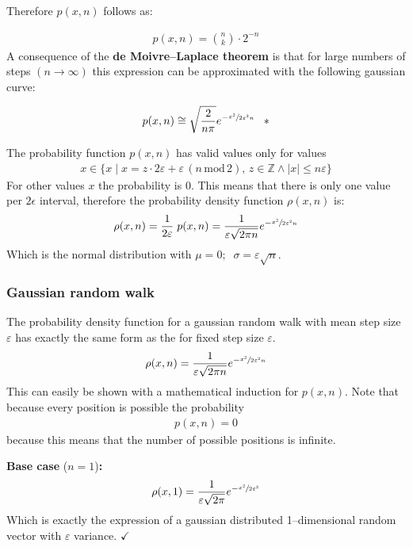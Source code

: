 \documentclass[a4paper, parskip=half]{scrartcl}
\newcommand{\effect}[1]{%
	\textbf{#1}%
}
\newcommand{\myEqLabel}[1]{\label{eq:#1}}
\newcommand{\myEqAnnex}[1]{\;\;\;\ast \myEqLabel{#1}}
\begin{document}
Therefore $p(x,n)$ follows as:

\begin{align}
p(x,n) = \binom{n}{k} \cdot 2^{-n}
\end{align}
A consequence of the \effect{de Moivre–Laplace theorem} is that for large numbers of steps $(n\rightarrow\infty)$ this expression can be approximated with the following gaussian curve:

\begin{align}
p(x,n) \cong \sqrt{\frac{2}{n \pi}} e^{-\sfrac{x^2}{2\varepsilon^2 n}} \myEqAnnex{moivre_laplace_theorem}
\end{align}

The probability function $p(x,n)$ has valid values only for values 
\begin{align}
x \in \{x\; |\; x = z \cdot 2 \varepsilon + \varepsilon\, (n\,\mathrm{mod}\, 2),\, z \in \mathbb{Z} \wedge |x| \leq n \varepsilon\} 
\end{align}
For other values $x$ the probability is $0$. This means that there is only one value per $2\epsilon$ interval, therefore the probability density function $\rho(x,n)$ is:
\begin{align}
\rho(x,n) = \frac{1}{2\varepsilon}\; p(x,n) = \frac{1}{\varepsilon\sqrt{2\pi n}} e^{-\sfrac{x^2}{2\varepsilon^2 n}}
\end{align}
Which is the normal distribution with $\mu = 0;\;\; \sigma =  \varepsilon\sqrt{n}$.

\subsubsection{Gaussian random walk}
The probability density function for a gaussian random walk with mean step size $\varepsilon$ has exactly the same form as the for fixed step size $\varepsilon$.
\begin{align}
\rho(x,n) = \frac{1}{\varepsilon\sqrt{2\pi n}} e^{-\sfrac{x^2}{2\varepsilon^2 n}} \myEqLabel{rho_gauss}
\end{align}
This can easily be shown with a mathematical induction for $p(x,n)$. Note that because every position is possible the probability 
\begin{align}
p(x,n) = 0 
\end{align}
because this means that the number of possible positions is infinite.

\textbf{Base case} ($n = 1$)\textbf{:}
\begin{align}
\rho(x,1) = \frac{1}{\varepsilon\sqrt{2\pi}} e^{-\sfrac{x^2}{2\varepsilon^2}}
\end{align}
Which is exactly the expression of a gaussian distributed 1--dimensional random vector with $\varepsilon$ variance. $\checkmark$
\end{document}
